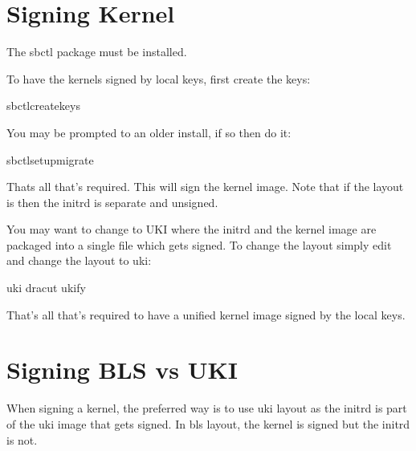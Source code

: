 \documentclass[letterpaper,11pt,english]{sphinxmanual}
\begin{document}
\section{Signing Kernel}
\label{\detokenize{Signed-Kernels:signing-kernel}}
\sphinxAtStartPar
The sbctl package must be installed.

\sphinxAtStartPar
To have the kernels signed by local keys, first create the keys:

\begin{sphinxVerbatim}[commandchars=\\\{\}]
sbctlcreate\PYGZhy{}keys
\end{sphinxVerbatim}

\sphinxAtStartPar
You may be prompted to  an older install, if so then do it:

\begin{sphinxVerbatim}[commandchars=\\\{\}]
sbctlsetup\PYGZhy{}\PYGZhy{}migrate
\end{sphinxVerbatim}

\sphinxAtStartPar
Thats all that’s required. This will sign the kernel image. Note that if the
layout is  then the initrd is separate and unsigned.

\sphinxAtStartPar
You may want to change to UKI where the initrd and the kernel image are packaged into
a single file which gets signed. To change the layout simply edit
 and change the layout to uki:

\begin{sphinxVerbatim}[commandchars=\\\{\}]
uki
dracut
ukify
\end{sphinxVerbatim}

\sphinxAtStartPar
That’s all that’s required to have a unified kernel image signed by the local keys.


\section{Signing BLS vs UKI}
\label{\detokenize{Signed-Kernels:signing-bls-vs-uki}}
\sphinxAtStartPar
When signing a kernel, the preferred way is to use uki layout as the initrd is part of
the uki image that gets signed. In bls layout, the kernel is signed but the initrd
is not.
\end{document}

